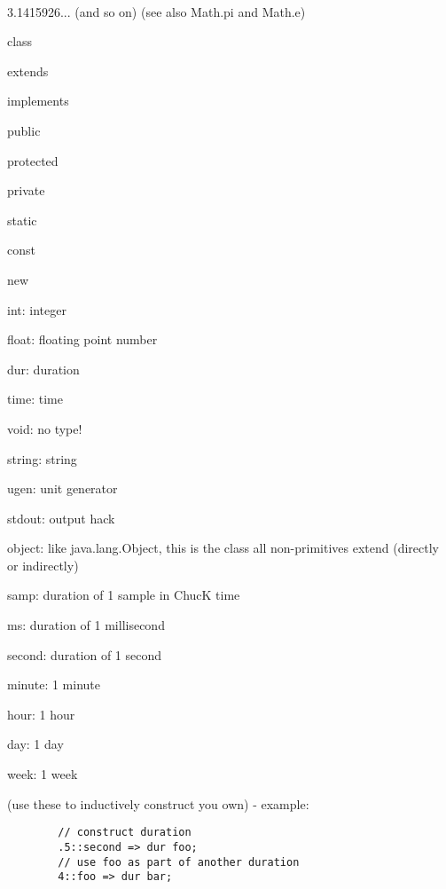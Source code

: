 \\
3.1415926... (and so on) (see also Math.pi and Math.e)

\begin{chuckitemize}
\item class
\item extends
\item implements
\item public
\item protected
\item private
\item static
\item const
\item new
\end{chuckitemize}

\begin{chuckitemize}
\item int: integer
\item float: floating point number
\item dur: duration
\item time: time
\item void: no type!
\item string: string
\item ugen: unit generator
\item stdout: output hack
\end{chuckitemize}



\begin{chuckitemize}
\item object: like java.lang.Object, this is the class all non-primitives extend (directly or indirectly)
\end{chuckitemize}

\begin{chuckitemize}
\item samp: duration of 1 sample in ChucK time
\item ms: duration of 1 millisecond
\item second: duration of 1 second
\item minute: 1 minute
\item hour: 1 hour
\item day: 1 day
\item week: 1 week
\item (use these to inductively construct you own) - example:
\end{chuckitemize}
\begin{verbatim}
        // construct duration
        .5::second => dur foo;
        // use foo as part of another duration
        4::foo => dur bar;
\end{verbatim}

